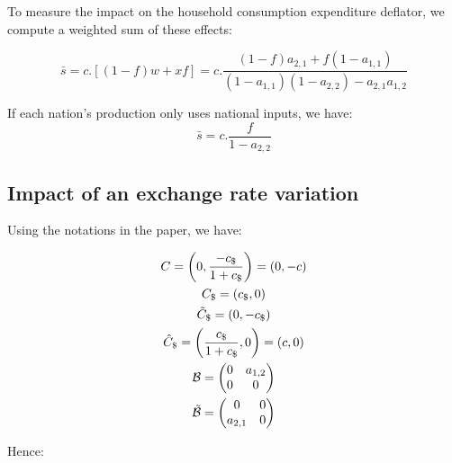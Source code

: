 \documentclass[11pt,a4paper]{article} %
\begin{document}
To measure the impact on the household consumption expenditure deflator, we compute a weighted sum of these effects:

\begin{equation}
\bar{s}=c.\left[\left(1-f\right)w+xf\right]=c.\frac{\left(1-f\right)a_{2,1}+f\left(1-a_{1,1}\right)}{\left(1-a_{1,1}\right)\left(1-a_{2,2}\right)-a_{2,1}a_{1,2}}
\end{equation}

If each nation's production only uses national inputs, we have:
\begin{equation*}
\bar{s}=c.\frac{f}{1-a_{2,2}}
\end{equation*}

\subsection*{Impact of an exchange rate variation}

Using the notations in the paper, we have:

\begin{gather*}
C=\left(0,\frac{-c_\$}{1+c_\$}\right)=\left(0,-c\right)
\\
C_\$=\left(c_\$,0\right)
\\
\tilde{C}_\$=\left(0,-c_\$\right)
\\
\hat{C}_\$=\left(\frac{c_\$}{1+c_\$},0\right)=\left(c,0\right)
\\
{\cal B} = \left(\begin{matrix}0&a_{1,2}\\0&0\end{matrix}\right)
\\
\tilde{\cal B} = \left(\begin{matrix}0&0\\a_{2,1}&0\end{matrix}\right)
\end{gather*}

Hence:
\end{document}

